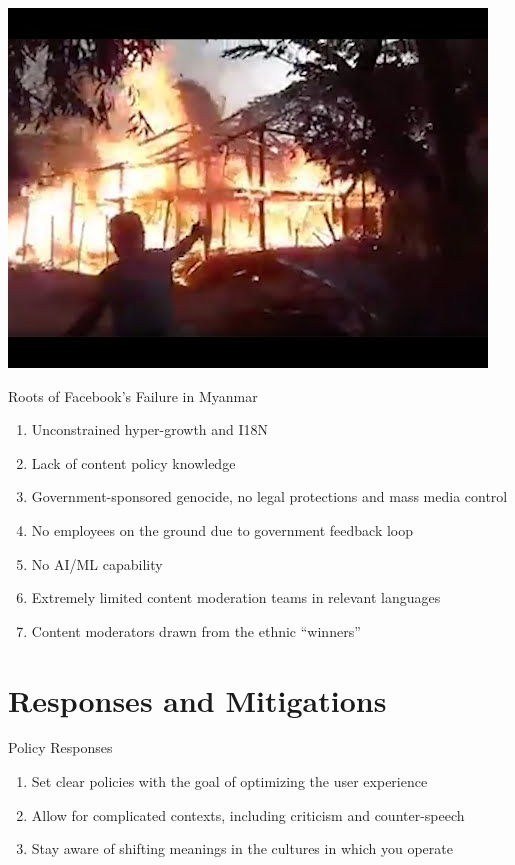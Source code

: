 \documentclass[nobackground,dvipsnames,table]{beamer}
\begin{document}
\begin{frame}{} 
    \href{https://youtu.be/wOTYwFr3cwU}{\includegraphics[width=\textwidth]{myanmar-homes-burning}}
\end{frame}

\begin{frame}{Roots of Facebook’s Failure in Myanmar}
    \large
    \begin{enumerate}
        \item Unconstrained hyper-growth and I18N
        \item Lack of content policy knowledge
        \item Government-sponsored genocide, no legal protections and mass media control
        \item No employees on the ground due to government feedback loop
        \item No AI/ML capability
        \item Extremely limited content moderation teams in relevant languages
        \item Content moderators drawn from the ethnic “winners”
    \end{enumerate}
\end{frame}

\section{Responses and Mitigations}

\begin{frame}{Policy Responses}
    \large
    \begin{enumerate}
        \item Set clear policies with the goal of optimizing the user experience
        \item Allow for complicated contexts, including criticism and counter-speech
        \item Stay aware of shifting meanings in the cultures in which you operate
    \end{enumerate}
\end{frame}
\end{document}
